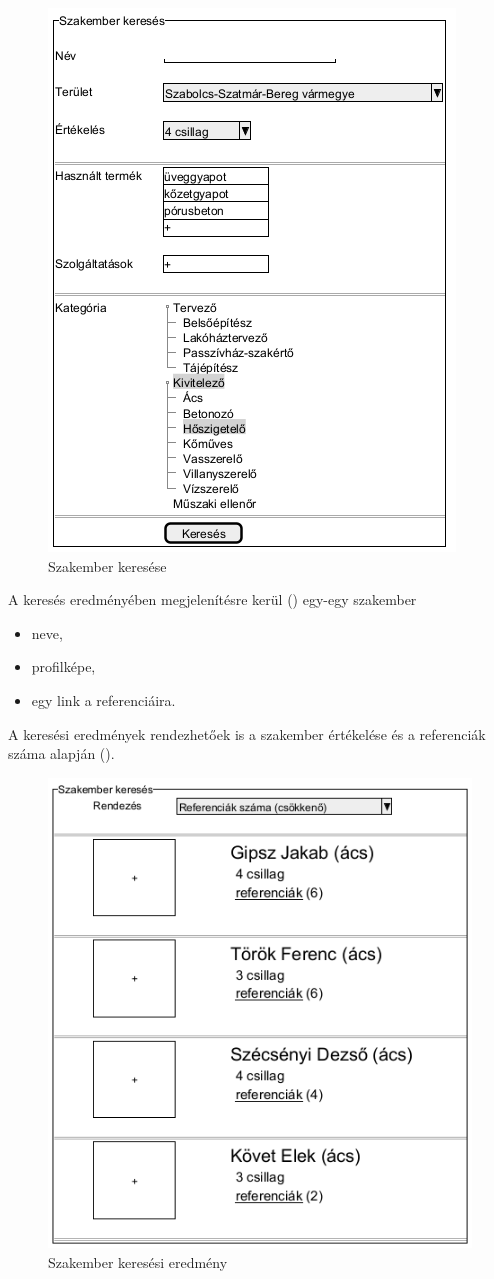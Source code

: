 \begin{figure}[h]
	\centering
	\includegraphics[scale=0.6]{img/szakember_keres.png}
	\caption*{Szakember keresése}
	\label{fig:szak_ker}
\end{figure}

A keresés eredményében megjelenítésre kerül () egy-egy szakember
\begin{itemize}
     \item neve,
     \item profilképe,
     \item egy link a referenciáira.
\end{itemize}

A keresési eredmények rendezhetőek is a szakember értékelése és a referenciák száma alapján ().

\begin{figure}[h]
	\centering
	\includegraphics[scale=0.6]{img/szakember_eredmeny.png}
	\caption*{Szakember keresési eredmény}
	\label{fig:szak_ker_ered}
\end{figure}